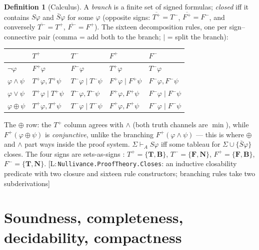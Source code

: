 \documentclass[11pt,a4paper]{article}
\theoremstyle{definition}
\newtheorem{definition}[theorem]{Definition}
\newcommand{\vT}{\mathbf{T}}
\newcommand{\vF}{\mathbf{F}}
\newcommand{\vB}{\mathbf{B}}
\newcommand{\vN}{\mathbf{N}}
\newcommand{\hmz}{\oplus}                       %
\newcommand{\Tp}{T^{+}}\newcommand{\Tm}{T^{-}}
\newcommand{\Fp}{F^{+}}\newcommand{\Fm}{F^{-}}
\newcommand{\dershort}{\vdash_{\!A}}
\newcommand{\lean}[1]{\texttt{#1}}
\begin{document}
\begin{definition}[Calculus]\label{def:calculus}
A \emph{branch} is a finite set of signed formulas; \emph{closed} iff it
contains $S\varphi$ and $\bar S\varphi$ for some $\varphi$ (opposite signs:
$\overline{\Tp}=\Tm$, $\overline{\Fp}=\Fm$, and conversely
$\overline{\Tm}=\Tp$, $\overline{\Fm}=\Fp$). The sixteen decomposition
rules, one per sign--connective pair (comma = add both to the branch;
$\mid$ = split the branch):

\begin{center}
\begin{tabular}{l@{\qquad}llll}
\toprule
 & $\Tp$ & $\Tm$ & $\Fp$ & $\Fm$ \\
\midrule
$\lnot\varphi$ &
  $\Fp\varphi$ & $\Fm\varphi$ & $\Tp\varphi$ & $\Tm\varphi$ \\
$\varphi\wedge\psi$ &
  $\Tp\varphi,\Tp\psi$ & $\Tm\varphi\mid\Tm\psi$ &
  $\Fp\varphi\mid\Fp\psi$ & $\Fm\varphi,\Fm\psi$ \\
$\varphi\vee\psi$ &
  $\Tp\varphi\mid\Tp\psi$ & $\Tm\varphi,\Tm\psi$ &
  $\Fp\varphi,\Fp\psi$ & $\Fm\varphi\mid\Fm\psi$ \\
$\varphi\hmz\psi$ &
  $\Tp\varphi,\Tp\psi$ & $\Tm\varphi\mid\Tm\psi$ &
  $\Fp\varphi,\Fp\psi$ & $\Fm\varphi\mid\Fm\psi$ \\
\bottomrule
\end{tabular}
\end{center}

The $\hmz$ row: the $\Tp$ column agrees with $\wedge$ (both truth channels
are $\min$), while $\Fp(\varphi\hmz\psi)$ is \emph{conjunctive}, unlike the
branching $\Fp(\varphi\wedge\psi)$ --- this is where $\hmz$ and $\wedge$
part ways inside the proof system. $\Sigma\dershort S\varphi$ iff some
tableau for $\Sigma\cup\{\bar S\varphi\}$ closes. The four signs are
sets-as-signs \cite{haehnle1994automated}: $\Tp=\{\vT,\vB\}$,
$\Tm=\{\vF,\vN\}$, $\Fp=\{\vF,\vB\}$, $\Fm=\{\vT,\vN\}$.
[L:\,\lean{Nullivance.ProofTheory.Closes}: an inductive closability
predicate with two closure and sixteen rule constructors; branching rules
take two subderivations]
\end{definition}

\section{Soundness, completeness, decidability, compactness}\label{sec:metatheory}
\end{document}
